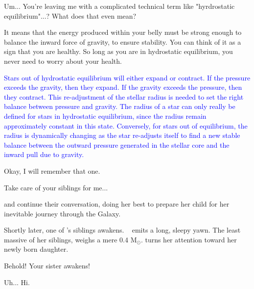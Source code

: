 \documentclass[main.tex]{subfiles}
\begin{document}
\par \Maia Um... You're leaving me with a complicated technical term like "hyrdrostatic equilibrium"...?  What does that even mean?

\par \Pleione It means that the energy produced within your belly must be strong enough to balance the inward force of gravity, to ensure stability.  You can think of it as a sign that you are healthy.  So long as you are in hydrostatic equilibrium, you never need to worry about your health.

\begin{tcolorbox}[sharp corners, colback=blue!30, colframe=blue!80!blue, title=What determines the radius of a star?]
\par \textcolor{blue} {Stars out of hydrostatic equilibrium will either expand or contract.  If the pressure exceeds the gravity, then they expand.  If the gravity exceeds the pressure, then they contract.  This re-adjustment of the stellar radius is needed to set the right balance between pressure and gravity.  The radius of a star can only really be defined for stars in hydrostatic equilibrium, since the radius remain approximately constant in this state.  Conversely, for stars out of equilibrium, the radius is dynamically changing as the star re-adjusts itself to find a new stable balance between the outward pressure generated in the stellar core and the inward pull due to gravity.}
\end{tcolorbox}

\par \Maia Okay, I will remember that one.

\par \Pleione Take care of your siblings for me...

\par \nar \rmmaia and \rmpleione continue their conversation, \rmpleione doing her best to prepare her child for her inevitable journey through the Galaxy.  

\par \nar Shortly later, one of \rmmaia's siblings awakens.  \rmelectra~ emits a long, sleepy yawn.  The least massive of her siblings, \rmelectra weighs a mere 0.4 M$_{\odot}$.  \rmpleione turns her attention toward her newly born daughter.

\par \Pleione Behold!  Your sister awakens!

\par \Electra  Uh... Hi.
\end{document}

